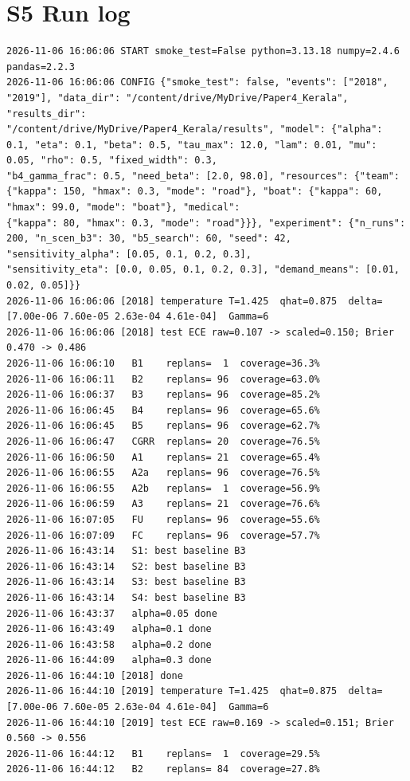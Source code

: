 \documentclass[10pt]{article}
\begin{document}
\section*{S5 Run log}\scriptsize\begin{verbatim}
2026-11-06 16:06:06 START smoke_test=False python=3.13.18 numpy=2.4.6 pandas=2.2.3
2026-11-06 16:06:06 CONFIG {"smoke_test": false, "events": ["2018", "2019"], "data_dir": "/content/drive/MyDrive/Paper4_Kerala", "results_dir":
"/content/drive/MyDrive/Paper4_Kerala/results", "model": {"alpha": 0.1, "eta": 0.1, "beta": 0.5, "tau_max": 12.0, "lam": 0.01, "mu": 0.05, "rho": 0.5, "fixed_width": 0.3,
"b4_gamma_frac": 0.5, "need_beta": [2.0, 98.0], "resources": {"team": {"kappa": 150, "hmax": 0.3, "mode": "road"}, "boat": {"kappa": 60, "hmax": 99.0, "mode": "boat"}, "medical":
{"kappa": 80, "hmax": 0.3, "mode": "road"}}}, "experiment": {"n_runs": 200, "n_scen_b3": 30, "b5_search": 60, "seed": 42, "sensitivity_alpha": [0.05, 0.1, 0.2, 0.3],
"sensitivity_eta": [0.0, 0.05, 0.1, 0.2, 0.3], "demand_means": [0.01, 0.02, 0.05]}}
2026-11-06 16:06:06 [2018] temperature T=1.425  qhat=0.875  delta=[7.00e-06 7.60e-05 2.63e-04 4.61e-04]  Gamma=6
2026-11-06 16:06:06 [2018] test ECE raw=0.107 -> scaled=0.150; Brier 0.470 -> 0.486
2026-11-06 16:06:10   B1    replans=  1  coverage=36.3%
2026-11-06 16:06:11   B2    replans= 96  coverage=63.0%
2026-11-06 16:06:37   B3    replans= 96  coverage=85.2%
2026-11-06 16:06:45   B4    replans= 96  coverage=65.6%
2026-11-06 16:06:45   B5    replans= 96  coverage=62.7%
2026-11-06 16:06:47   CGRR  replans= 20  coverage=76.5%
2026-11-06 16:06:50   A1    replans= 21  coverage=65.4%
2026-11-06 16:06:55   A2a   replans= 96  coverage=76.5%
2026-11-06 16:06:55   A2b   replans=  1  coverage=56.9%
2026-11-06 16:06:59   A3    replans= 21  coverage=76.6%
2026-11-06 16:07:05   FU    replans= 96  coverage=55.6%
2026-11-06 16:07:09   FC    replans= 96  coverage=57.7%
2026-11-06 16:43:14   S1: best baseline B3
2026-11-06 16:43:14   S2: best baseline B3
2026-11-06 16:43:14   S3: best baseline B3
2026-11-06 16:43:14   S4: best baseline B3
2026-11-06 16:43:37   alpha=0.05 done
2026-11-06 16:43:49   alpha=0.1 done
2026-11-06 16:43:58   alpha=0.2 done
2026-11-06 16:44:09   alpha=0.3 done
2026-11-06 16:44:10 [2018] done
2026-11-06 16:44:10 [2019] temperature T=1.425  qhat=0.875  delta=[7.00e-06 7.60e-05 2.63e-04 4.61e-04]  Gamma=6
2026-11-06 16:44:10 [2019] test ECE raw=0.169 -> scaled=0.151; Brier 0.560 -> 0.556
2026-11-06 16:44:12   B1    replans=  1  coverage=29.5%
2026-11-06 16:44:12   B2    replans= 84  coverage=27.8%

\end{verbatim}
\end{document}
